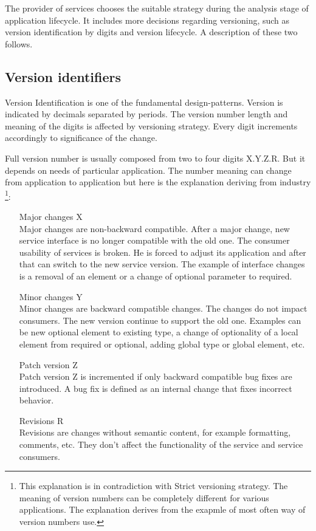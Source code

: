 The provider of services chooses the suitable strategy during the analysis stage of application lifecycle. It includes more decisions regarding versioning, such as version identification by digits and version lifecycle. A description of these two follows.

\subsection{Version identifiers}
\label{subsec:versionid}
Version Identification is one of the fundamental \gls{design-patterns}. Version is indicated by decimals separated by periods. The version number length and meaning of the digits is affected by versioning strategy. Every digit increments accordingly to significance of the change. 

Full version number is usually composed from two to four digits X.Y.Z.R. But it depends on needs of particular application. The number meaning can change from application to application but here is the explanation deriving from industry \cite{soa-governance} \footnote{This explanation is in contradiction with Strict versioning strategy. The meaning of version numbers can be completely different for various applications. The explanation derives from the exapmle of most often way of version numbers use.}:


\begin{enumerate}
  \item[Major changes X] \hfill \\
  Major changes are non-backward compatible. After a major change, new service interface is no longer compatible with the old one. The consumer usability of services is broken. He is forced to adjust its application and after that can switch to the new service version. The example of interface changes is a removal of an element or a change of optional parameter to required.

    \item[Minor changes Y] \hfill \\
  Minor changes are backward compatible changes. The changes do not impact consumers. The new version continue to support the old one. Examples can be new optional element to existing type, a change of optionality of a local element from required or optional, adding global type or global element, etc.
  
  \item[Patch version Z] \hfill \\  
  Patch version Z is incremented if only backward compatible bug fixes are introduced. A bug fix is defined as an internal change that fixes incorrect behavior.
  
  \item[Revisions R] \hfill \\ 
  Revisions are changes without semantic content, for example formatting, comments, etc. They don't affect the functionality of the service and service consumers.
\end{enumerate} 

